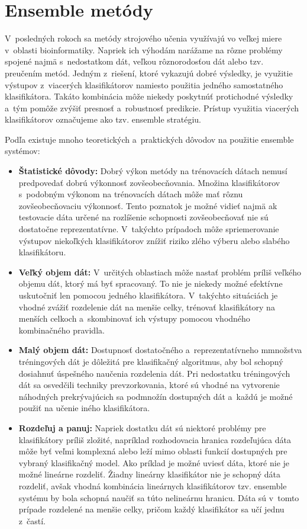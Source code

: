 \chapter{Ensemble metódy}

V~posledných rokoch sa metódy strojového učenia využívajú vo veľkej miere v~oblasti bioinformatiky. Napriek ich výhodám narážame na rôzne problémy spojené najmä s~nedostatkom dát, veľkou rôznorodosťou dát alebo tzv. preučením metód. Jedným z~riešení, ktoré vykazujú dobré výsledky, je využitie výstupov z~viacerých klasifikátorov namiesto použitia jedného samostatného klasifikátora. Takáto kombinácia môže niekedy poskytnúť protichodné výsledky a~tým pomôže zvýšiť presnosť a~robustnosť predikcie. Prístup využitia viacerých klasifikátorov označujeme ako tzv. ensemble stratégiu.

Podľa \cite{polikar} existuje mnoho teoretických a~praktických dôvodov na použitie ensemble systémov:
\begin{itemize}
	\item \textbf{Štatistické dôvody:} Dobrý výkon metódy na trénovacích dátach nemusí predpovedať dobrú výkonnosť zovšeobecňovania. Množina klasifikátorov s~podobným výkonom na trénovacích dátach môže mať rôznu zovšeobecňovaciu výkonnosť. Tento poznatok je možné vidieť najmä ak testovacie dáta určené na rozlíšenie schopnosti zovšeobecňovať nie sú dostatočne reprezentatívne. V~takýchto prípadoch môže spriemerovanie výstupov niekoľkých klasifikátorov znížiť riziko zlého výberu alebo slabého klasifikátoru. 
	\item \textbf{Veľký objem dát:} V~určitých oblastiach môže nastať problém príliš veľkého objemu dát, ktorý má byť spracovaný. To nie je niekedy možné efektívne uskutočniť len pomocou jedného klasifikátora. V~takýchto situáciách je vhodné zvážiť rozdelenie dát na menšie celky, trénovať klasifikátory na menších celkoch a~skombinovať ich výstupy pomocou vhodného kombinačného pravidla.
	\item \textbf{Malý objem dát:} Dostupnosť dostatočného a~reprezentatívneho mmnožstva tréningových dát je dôležitá pre klasifikačný algoritmus, aby bol schopný dosiahnuť úspešného naučenia rozdelenia dát. Pri nedostatku tréningových dát sa osvedčili techniky prevzorkovania, ktoré sú vhodné na vytvorenie náhodných prekrývajúcich sa podmnožín dostupných dát a~každú je možné použiť na učenie iného klasifikátora.
	\item \textbf{Rozdeľuj a panuj:} Napriek dostatku dát sú niektoré problémy pre klasifikátory príliš zložité, napríklad rozhodovacia hranica rozdeľujúca dáta môže byť veľmi komplexná alebo leží mimo oblasti funkcií dostupných pre vybraný klasifikačný model. Ako príklad je možné uviesť dáta, ktoré nie je možné lineárne rozdeliť. Žiadny lineárny klasifikátor nie je schopný dáta rozdeliť, avšak vhodná kombinácia lineárnych klasifikátorov tzv. ensemble systému by bola schopná naučiť sa túto nelineárnu hranicu. Dáta sú v~tomto prípade rozdelené na menšie celky, pričom každý klasifikátor sa učí jednu z~častí.
\end{itemize}


